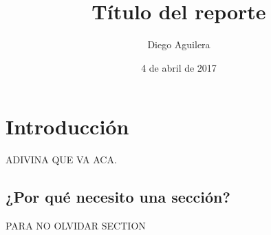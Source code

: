 \documentclass[spanish]{udpreport}
\title{Título del reporte}
\author{Diego Aguilera}
\date{4 de abril de 2017}
\begin{document}
\maketitle

\tableofcontents

\chapter{Introducción}
ADIVINA QUE VA ACA.

\section{¿Por qué necesito una sección?}
PARA NO OLVIDAR SECTION

\listoffigures
\end{document}
